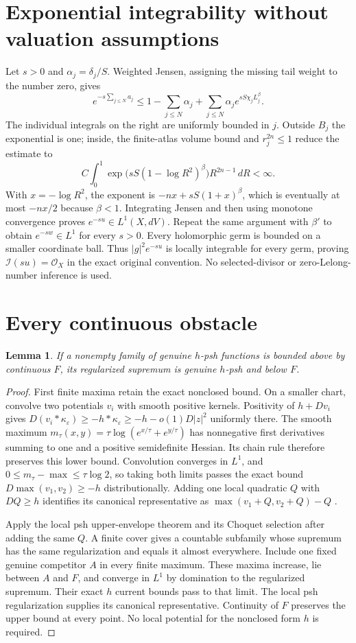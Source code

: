 \documentclass[11pt]{article}
\newtheorem{lemma}[theorem]{Lemma}
\theoremstyle{remark}\newtheorem{remark}[theorem]{Remark}
\newcommand{\ddc}{D}
\newcommand{\OO}{\mathcal O_X}
\begin{document}
\section{Exponential integrability without valuation assumptions}
Let $s>0$ and $\alpha_j=\delta_j/S$. Weighted Jensen, assigning the
missing tail weight to the number zero, gives
\[
 e^{-s\sum_{j\leq N}a_j}
 \leq1-\sum_{j\leq N}\alpha_j
       +\sum_{j\leq N}\alpha_j e^{sS\chi_j L_j^\beta}.
\]
The individual integrals on the right are uniformly bounded in $j$.
Outside $B_j$ the exponential is one; inside, the finite-atlas volume
bound and $r_j^{2n}\leq1$ reduce the estimate to
\[
 C\int_0^1\exp\bigl(sS(1-\log R^2)^\beta\bigr)R^{2n-1}\,dR<\infty.
\]
With $x=-\log R^2$, the exponent is $-nx+sS(1+x)^\beta$,
which is eventually at most $-nx/2$ because $\beta<1$.
Integrating Jensen and then using monotone convergence proves
$e^{-su}\in L^1(X,dV)$. Repeat the same argument with $\beta'$ to
obtain $e^{-sw}\in L^1$ for every $s>0$. Every holomorphic germ is bounded
on a smaller coordinate ball. Thus $|g|^2e^{-su}$ is locally integrable
for every germ, proving $\mathcal I(su)=\OO$ in the exact original
convention. No selected-divisor or zero-Lelong-number inference is used.

\section{Every continuous obstacle}
\begin{lemma}\label{lem:envelope}
If a nonempty family of genuine $h$-psh functions is bounded above by
continuous $F$, its regularized supremum is genuine $h$-psh and below $F$.
\end{lemma}
\begin{proof}
First finite maxima retain the exact nonclosed bound. On a smaller chart,
convolve two potentials $v_i$ with smooth positive kernels. Positivity of
$h+\ddc v_i$ gives $\ddc(v_i*\kappa_\varepsilon)
\geq-h*\kappa_\varepsilon\geq-h-o(1)\ddc|z|^2$ uniformly there.
The smooth maximum
$m_\tau(x,y)=\tau\log(e^{x/\tau}+e^{y/\tau})$ has nonnegative first
derivatives summing to one and a positive semidefinite Hessian. Its
chain rule therefore preserves this lower bound. Convolution converges
in $L^1$, and $0\leq m_\tau-\max\leq\tau\log2$, so taking both limits
passes the exact bound $\ddc\max(v_1,v_2)\geq-h$ distributionally.
Adding one local quadratic $Q$ with $\ddc Q\geq h$ identifies its
canonical representative as $\max(v_1+Q,v_2+Q)-Q$
\cite[Theorem I.5.6]{Dem}.

Apply the local psh upper-envelope theorem and its Choquet selection
\cite[Theorem I.5.7 and its proof]{Dem} after adding the same $Q$.
A finite cover gives a countable subfamily whose supremum has the same
regularization and equals it almost everywhere. Include one fixed
genuine competitor $A$ in every finite maximum. These maxima increase,
lie between $A$ and $F$, and converge in $L^1$ by domination to the
regularized supremum. Their exact $h$ current bounds pass to that limit.
The local psh regularization supplies its canonical representative.
Continuity of $F$ preserves the upper bound at every point. No local
potential for the nonclosed form $h$ is required.
\end{proof}
\end{document}
